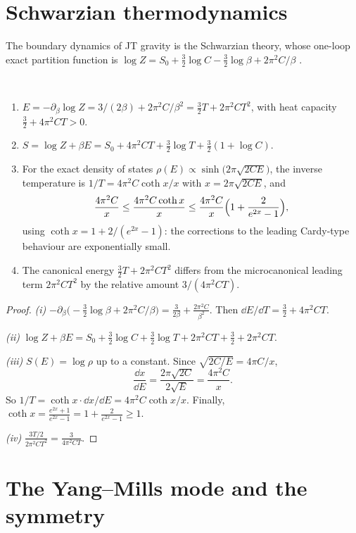 \section{Schwarzian thermodynamics}

The boundary dynamics of JT gravity is the Schwarzian theory, whose one-loop exact partition function is $\log Z=S_0+\frac32\log C-\frac32\log\beta+2\pi^2C/\beta$ \cite{StanfordWitten2017} \ext.

\begin{theorem}\label{thm:schwarzian}\ver\
\begin{enumerate}[label=(\roman*)]
\item $E=-\partial_\beta\log Z=3/(2\beta)+2\pi^2C/\beta^2=\frac32T+2\pi^2CT^2$, with heat capacity $\frac32+4\pi^2CT>0$.
\item $S=\log Z+\beta E=S_0+4\pi^2CT+\frac32\log T+\frac32(1+\log C)$.
\item For the exact density of states $\rho(E)\propto\sinh\bigl(2\pi\sqrt{2CE}\bigr)$, the inverse temperature is $1/T=4\pi^2C\coth x/x$ with $x=2\pi\sqrt{2CE}$, and
\[
\frac{4\pi^2C}x\le\frac{4\pi^2C\coth x}x\le\frac{4\pi^2C}x\Bigl(1+\frac2{e^{2x}-1}\Bigr),
\]
using $\coth x=1+2/(e^{2x}-1)$: the corrections to the leading Cardy-type behaviour are exponentially small.
\item The canonical energy $\frac32T+2\pi^2CT^2$ differs from the microcanonical leading term $2\pi^2CT^2$ by the relative amount $3/(4\pi^2CT)$.
\end{enumerate}
\end{theorem}
\begin{proof}
\emph{(i)} $-\partial_\beta\bigl(-\frac32\log\beta+2\pi^2C/\beta\bigr)=\frac3{2\beta}+\frac{2\pi^2C}{\beta^2}$. Then $\dd E/\dd T=\frac32+4\pi^2CT$.

\emph{(ii)} $\log Z+\beta E=S_0+\frac32\log C+\frac32\log T+2\pi^2CT+\frac32+2\pi^2CT$.

\emph{(iii)} $S(E)=\log\rho$ up to a constant. Since $\sqrt{2C/E}=4\pi C/x$,
\[
\frac{\dd x}{\dd E}=\frac{2\pi\sqrt{2C}}{2\sqrt E}=\frac{4\pi^2C}x .
\]
So $1/T=\coth x\cdot\dd x/\dd E=4\pi^2C\coth x/x$. Finally, $\coth x=\frac{e^{2x}+1}{e^{2x}-1}=1+\frac2{e^{2x}-1}\ge1$.

\emph{(iv)} $\frac{3T/2}{2\pi^2CT^2}=\frac3{4\pi^2CT}$.
\end{proof}


\section{The Yang--Mills mode and the symmetry}

